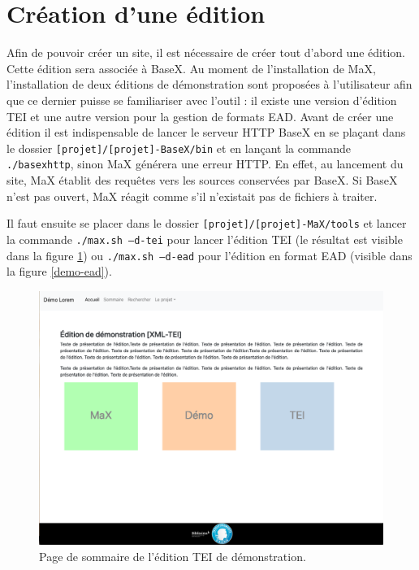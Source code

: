 \documentclass[a4paper,12pt,twoside]{book}
\begin{document}
\section{Création d'une édition
}
Afin de pouvoir créer un site, il est nécessaire de créer tout d'abord une édition. Cette édition sera associée à BaseX. Au moment de l'installation de MaX, l'installation de deux éditions de démonstration sont proposées à l'utilisateur afin que ce dernier puisse se familiariser avec l'outil : il existe une version d'édition TEI et une autre version pour la gestion de formats EAD. Avant de créer une édition il est indispensable de lancer le serveur HTTP BaseX en se plaçant dans le dossier \texttt{[projet]/[projet]-BaseX/bin} et en lançant la commande \texttt{./basexhttp}, sinon MaX générera une erreur HTTP. En effet, au lancement du site, MaX établit des requêtes vers les sources conservées par BaseX. Si BaseX n'est pas ouvert, MaX réagit comme s'il n'existait pas de fichiers à traiter.

Il faut ensuite se placer dans le dossier \texttt{[projet]/[projet]-MaX/tools} et lancer la commande \texttt{./max.sh --d-tei} pour lancer l'édition TEI (le résultat est visible dans la figure \ref{demo-tei}) ou \texttt{./max.sh --d-ead} pour l'édition en format EAD (visible dans la figure \ref{demo-ead}).

\begin{figure}[H]
    \centering
    \includegraphics[width=13cm]{img/partie_2/demoTei.png}
    \caption{Page de sommaire de l'édition TEI de démonstration.}
    \label{demo-tei}
\end{figure}
\end{document}
